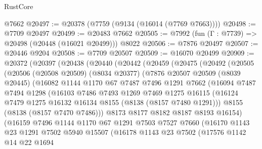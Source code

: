 \begin{lexlean}{RustCore}
\begin{coremodule}
    @7662
@20497 := @20378 (@7759 (@9134 (@16014 (@7769 @7663))))
@20498 := @7709 @20497
@20499 := @20483 @7662
@20505 := @7992 (fun (Γ : @7739) => @20498 (@20448 (@16021 @20499))) @8022
@20506 := @7876 @20497
@20507 := @20446 @9204
@20508 := @7709 @20507
@20509 := @16070 @20499
@20909 := @20372
    (@20397
      (@20438
        (@20440
          (@20442
            (@20459
              (@20475
                (@20492
                  (@20505
                    (@20506
                      (@20508 @20509)
                      (@8034 @20377)
                      (@7876
                        @20507
                        @20509
                        (@8039 @20445)
                        (@16082
                          @1144
                          @1170
                          @67
                          @7487
                          @7496
                          @1291
                          @7662
                          (@16094
                            @7487
                            @7494
                            @1298
                            (@16103
                              @7486
                              @7493
                              @1269
                              @7469
                              @1275
                              @16115
                              (@16124 @7479 @1275 @16132 @16134 @8155 (@8138 (@8157 @7480 @1291)))
                              @8155
                              (@8138 (@8157 @7470 @7486)))
                            @8173
                            @8177
                            @8182
                            @8187
                            @8193
                            @16154)
                          (@16159
                            @7496
                            @1144
                            @1170
                            @67
                            @1291
                            @7503
                            @7527
                            @7660
                            (@16170
                              @1143
                              @23
                              @1291
                              @7502
                              @5940
                              @15507
                              (@16178
                                @1143
                                @23
                                @7502
                                (@17576
                                  @1142
                                  @14
                                  @22
                                  @1694

\end{coremodule}
\end{lexlean}
